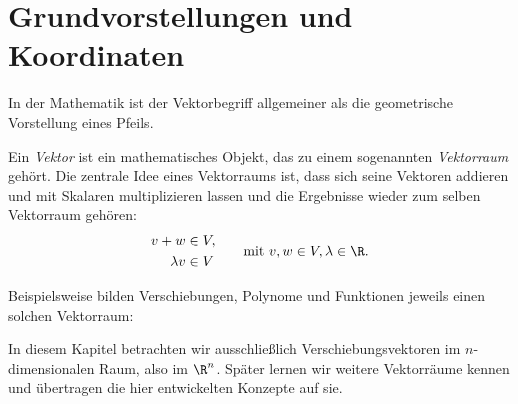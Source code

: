 \section{Grundvorstellungen und Koordinaten}
\label{sec:vector_algebra_fundamentals}

In der Mathematik ist der Vektorbegriff allgemeiner als die geometrische
Vorstellung eines Pfeils.

\begin{RemarkBox}[remark title=Abstrakter Vektorbegriff]
  \label{rem:vector_algebra_abstract_vector_concept}
  Ein \emph{Vektor}  ist ein mathematisches Objekt, das zu einem sogenannten
  \emph{Vektorraum}  gehört. Die zentrale Idee
  eines Vektorraums ist, dass sich seine Vektoren addieren und mit
  Skalaren multiplizieren lassen und die Ergebnisse wieder zum selben
  Vektorraum gehören:
  \[
    \begin{aligned}
      v+w       &\in V,\\
      \lambda v &\in V
    \end{aligned}
    \qquad
    \text{mit } v,w\in V, \lambda\in\R.
  \]
\end{RemarkBox}

Beispielsweise bilden Verschiebungen, Polynome und Funktionen jeweils einen
solchen Vektorraum:

\begin{center}
\end{center}

In diesem Kapitel betrachten wir ausschließlich Verschiebungsvektoren im
$n$-dimensionalen Raum, also im $\R^n$. Später lernen wir weitere Vektorräume
kennen und übertragen die hier entwickelten Konzepte auf sie.


\clearpage

